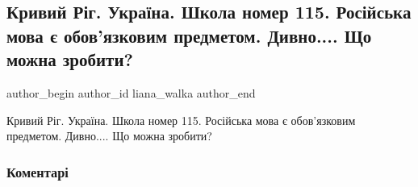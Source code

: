  
 
 
 
 
\subsection{Кривий Ріг. Україна. Школа номер  115. Російська мова є обов'язковим предметом. Дивно.... Що можна зробити?}
\label{sec:27_07_2021.fb.liana_walka.1.mova_krivoj_rog_shkola_115}
\ifcmt
 author_begin
   author_id liana_walka
 author_end
\fi

Кривий Ріг.
Україна.
Школа номер  115.
Російська мова є обов'язковим предметом.
Дивно....
Що можна зробити?

\subsubsection{Коментарі}

